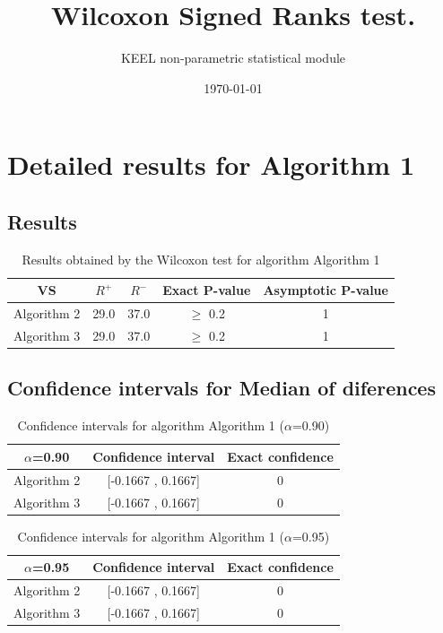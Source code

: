 \documentclass[a4paper,10pt]{article}
\title{Wilcoxon Signed Ranks test.}
\date{\today}
\author{KEEL non-parametric statistical module}
\begin{document}
\pagestyle{empty}
\maketitle
\thispagestyle{empty}



\section{Detailed results for Algorithm 1}


\subsection{Results}

\begin{table}[!htp]
\centering\small
\begin{tabular}{
|c|c|c|c|c|}
\hline
 VS & $R^{+}$ & $R^{-}$ & Exact P-value & Asymptotic P-value \\ \hline 
Algorithm 2 & 29.0 & 37.0 & $\geq$ 0.2 & 1\\ \hline 
Algorithm 3 & 29.0 & 37.0 & $\geq$ 0.2 & 1\\ \hline 

\end{tabular}
\caption{Results obtained by the Wilcoxon test for algorithm Algorithm 1}
\end{table}

\subsection{Confidence intervals for Median of diferences}

\begin{table}[!htp]
\centering\small
\begin{tabular}{
|c|c|c|}
\hline
 $\alpha$=0.90 & Confidence interval & Exact confidence \\ \hline 
Algorithm 2 & [-0.1667 , 0.1667] & 0\\ \hline 
Algorithm 3 & [-0.1667 , 0.1667] & 0\\ \hline 

\end{tabular}
\caption{Confidence intervals for algorithm Algorithm 1 ($\alpha$=0.90)}
\end{table}
\begin{table}[!htp]
\centering\small
\begin{tabular}{
|c|c|c|}
\hline
 $\alpha$=0.95 & Confidence interval & Exact confidence \\ \hline 
Algorithm 2 & [-0.1667 , 0.1667] & 0\\ \hline 
Algorithm 3 & [-0.1667 , 0.1667] & 0\\ \hline 

\end{tabular}
\caption{Confidence intervals for algorithm Algorithm 1 ($\alpha$=0.95)}
\end{table}
\end{document}
